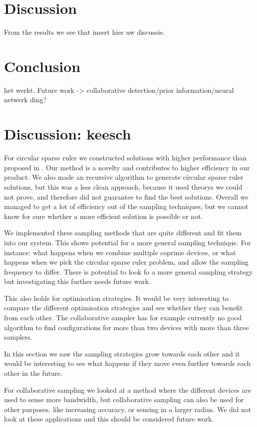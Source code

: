\documentclass[a4paper, openany, oneside]{memoir}
\begin{document}
\section{Discussion}
From the results we see that insert hier uw discussie.

\section{Conclusion}
het werkt. Future work -> collaborative detection/prior information/neural netwerk ding?

\section{Discussion: keesch}
For circular sparse ruler we constructed solutions with higher performance than proposed in \cite{ariananda2012compressive}. Our method is a novelty and contributes to higher efficiency in our product. We also made an recursive algorithm to generate circular sparse ruler solutions,  but this was a less clean approach, because it used  theorys we could not prove, and therefore did not guarantee to find the best solutions. Overall we managed to get a lot of efficiency out of the sampling techniques, but we cannot know for sure whether a more efficient solution is possible or not.

We implemented three sampling methods that are quite different and fit them into our system. This shows potential for a more general sampling technique. For instance: what happens when we combine multiple coprime devices, or what happens when we pick the circular sparse ruler problem, and allow the sampling frequency to differ. There is potential to look fo a more general sampling strategy but investigating this further needs future work.

This also holds for optimisation strategies. It would be very interesting to compare the different optimisation strategies and see whether they can benefit from each other. The collaborative sampler has for example currently no good algorithm to find configurations for more than two devices with more than three samplers. 

In this section we saw the sampling strategies grow towards each other and it would be interesting to see what happens if they move even further towards each other in the future. 

For collaborative sampling we looked at a method where the different devices are used to sense more bandwidth, but collaborative sampling can also be used for other purposes, like increasing accuracy, or sensing in a larger radius. We did not look at these applications and this should be considered future work.
\end{document}
